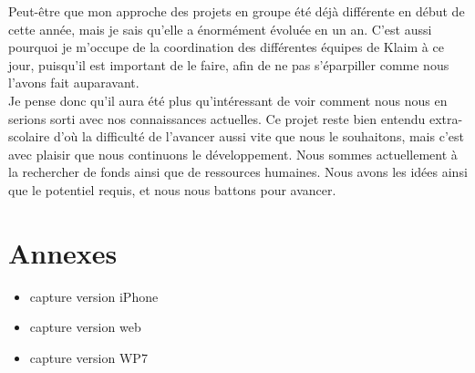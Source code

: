 \documentclass{article}
\begin{document}
		Peut-être que mon approche des projets en groupe été déjà différente en début de cette année, mais je sais qu'elle a énormément évoluée en un an. C'est aussi pourquoi je m'occupe de la coordination des différentes équipes de Klaim à ce jour, puisqu'il est important de le faire, afin de ne pas s'éparpiller comme nous l'avons fait auparavant.\\
		
		Je pense donc qu'il aura été plus qu'intéressant de voir comment nous nous en serions sorti avec nos connaissances actuelles. Ce projet reste bien entendu extra-scolaire d'où la difficulté de l'avancer aussi vite que nous le souhaitons, mais c'est avec plaisir que nous continuons le développement. Nous sommes actuellement à la rechercher de fonds ainsi que de ressources humaines. Nous avons les idées ainsi que le potentiel requis, et nous nous battons pour avancer.
	
\newpage	
\section{Annexes}
	\begin{itemize}
		\item capture version iPhone
		\item capture version web
		\item capture version WP7
	\end{itemize}
\end{document}
